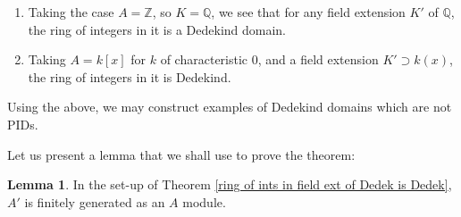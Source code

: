 \documentclass[12 pt]{article}
\theoremstyle{definition}
\newtheorem{lemma}[thm]{Lemma}
\renewcommand{\(}{\left(}
\renewcommand{\)}{\right)}
\newcommand\qq{\mathbb{Q}}
\newcommand\zz{\mathbb{Z}}
\begin{document}
\begin{enumerate}
\item Taking the case $A=\zz$, so $K=\qq$, we see that for any field extension $K'$ of $\qq$, the ring of integers in it is a Dedekind domain.

\item Taking $A=k[x]$ for $k$ of characteristic 0, and a field extension $K' \supset k(x)$, the ring of integers in it is Dedekind.
\end{enumerate}

Using the above, we may construct examples of Dedekind domains which are not PIDs.


Let us present a lemma that we shall use to prove the theorem:
\begin{lemma} In the set-up of Theorem \ref{ring of ints in field ext of Dedek is Dedek}, $A'$ is finitely generated as an $A$ module.
\end{lemma}
\end{document}
